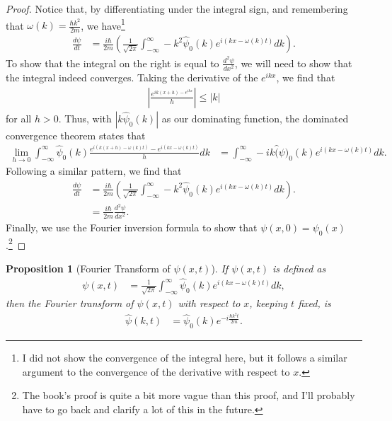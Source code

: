 \documentclass[12pt]{extarticle}
\theoremstyle{plain}
\newtheorem*{proposition}{Proposition}%
\theoremstyle{definition}
\theoremstyle{remark}
\begin{document}
  \begin{proof}
    Notice that, by differentiating under the integral sign, and remembering that $\omega(k) = \frac{\hbar k^2}{2m}$, we have\footnote{I did not show the convergence of the integral here, but it follows a similar argument to the convergence of the derivative with respect to $x$.}
    \begin{align*}
      \frac{d\psi}{dt} &= \frac{i\hbar}{2m}\left(\frac{1}{\sqrt{2\pi}}\int_{-\infty}^{\infty}-k^2\hat{\psi}_0(k)e^{i(kx - \omega(k)t)}dk\right).
    \end{align*}
    To show that the integral on the right is equal to $\frac{d^2\psi}{dx^2}$, we will need to show that the integral indeed converges. Taking the derivative of the $e^{ikx}$, we find that
    \begin{align*}
      \left\vert \frac{e^{ik(x+h)-e^{ikx}}}{h} \right\vert\leq |k|
    \end{align*}
    for all $h > 0$. Thus, with $|k\hat{\psi}_0(k)|$ as our dominating function, the dominated convergence theorem states that
    \begin{align*}
      \lim_{h\rightarrow 0}\int_{-\infty}^{\infty}\hat{\psi}_0(k)\frac{e^{i\left(k(x+h) - \omega(k)t\right)} - e^{i(kx - \omega(k)t)}}{h}dk &= \int_{-\infty}^{\infty}-ik\hat(\psi)_0(k)e^{i\left(kx - \omega(k)t\right)}dk.
    \end{align*}
    Following a similar pattern, we find that
    \begin{align*}
      \frac{d\psi}{dt} &= \frac{i\hbar}{2m}\left(\frac{1}{\sqrt{2\pi}}\int_{-\infty}^{\infty}-k^2\hat{\psi}_0(k)e^{i(kx - \omega(k)t)}dk\right).\\
                       &= \frac{i\hbar}{2m}\frac{d^2\psi}{dx^2}.
    \end{align*}
    Finally, we use the Fourier inversion formula to show that $\psi(x,0) = \psi_0(x)$.\footnote{The book's proof is quite a bit more vague than this proof, and I'll probably have to go back and clarify a lot of this in the future.}
  \end{proof}
  \begin{proposition}[Fourier Transform of $\psi(x,t)$]
    If $\psi(x,t)$ is defined as
    \begin{align*}
      \psi(x,t) &= \frac{1}{\sqrt{2\pi}}\int_{-\infty}^{\infty}\hat{\psi}_0(k)e^{i(kx - \omega(k)t)}dk,
    \end{align*}
    then the Fourier transform of $\psi(x,t)$ with respect to $x$, keeping $t$ fixed, is
    \begin{align*}
      \hat{\psi}(k,t) &= \hat{\psi}_0(k)e^{-i\frac{\hbar k^2 t}{2m}}.
    \end{align*}
  \end{proposition}
\end{document}
